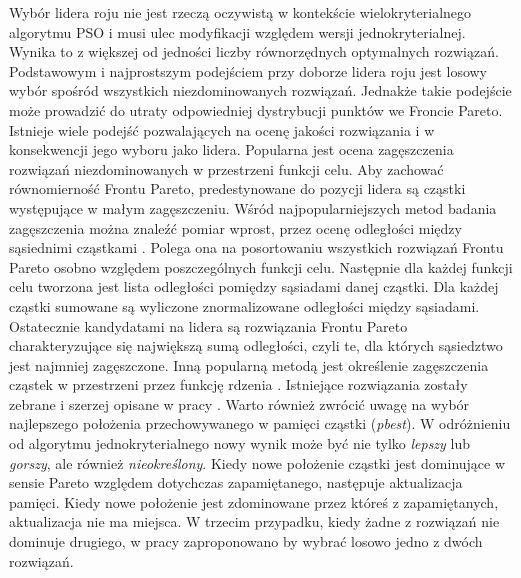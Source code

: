 Wybór lidera roju nie jest rzeczą oczywistą w kontekście wielokryterialnego algorytmu PSO i musi ulec modyfikacji względem wersji jednokryterialnej. Wynika to z większej od jedności liczby równorzędnych optymalnych rozwiązań. Podstawowym i najprostszym podejściem przy doborze lidera roju jest losowy wybór spośród wszystkich niezdominowanych rozwiązań. Jednakże takie podejście może prowadzić do utraty odpowiedniej dystrybucji punktów we Froncie Pareto. Istnieje wiele podejść pozwalających na ocenę jakości rozwiązania i w konsekwencji jego wyboru jako lidera. Popularna jest ocena zagęszczenia rozwiązań niezdominowanych w przestrzeni funkcji celu. Aby zachować równomierność Frontu Pareto, predestynowane do pozycji lidera są cząstki występujące w małym zagęszczeniu. Wśród najpopularniejszych metod badania zagęszczenia można znaleźć pomiar wprost, przez ocenę odległości między sąsiednimi cząstkami \parencite{Deb2002}. Polega ona na posortowaniu wszystkich rozwiązań Frontu Pareto osobno względem poszczególnych funkcji celu. Następnie dla każdej funkcji celu tworzona jest lista odległości pomiędzy sąsiadami danej cząstki. Dla każdej cząstki sumowane są wyliczone znormalizowane odległości między sąsiadami. Ostatecznie kandydatami na lidera są rozwiązania Frontu Pareto charakteryzujące się największą sumą odległości, czyli te, dla których sąsiedztwo jest najmniej zagęszczone. Inną popularną metodą jest określenie zagęszczenia cząstek w przestrzeni przez funkcję rdzenia \parencite{Deb1989}. Istniejące rozwiązania zostały zebrane i szerzej opisane w pracy \parencite{CoelloCoello2006}. Warto również zwrócić uwagę na wybór najlepszego położenia przechowywanego w pamięci cząstki  (\textit{pbest}). W odróżnieniu od algorytmu jednokryterialnego nowy wynik może być nie tylko \textit{lepszy} lub \textit{gorszy}, ale również \textit{nieokreślony}. Kiedy nowe położenie cząstki jest dominujące w sensie Pareto względem dotychczas zapamiętanego, następuje aktualizacja pamięci. Kiedy nowe położenie jest zdominowane przez któreś z zapamiętanych, aktualizacja nie ma miejsca. W trzecim przypadku, kiedy żadne z rozwiązań nie dominuje drugiego, w pracy \cite{CoelloCoello2002} zaproponowano by wybrać losowo jedno z dwóch rozwiązań.

